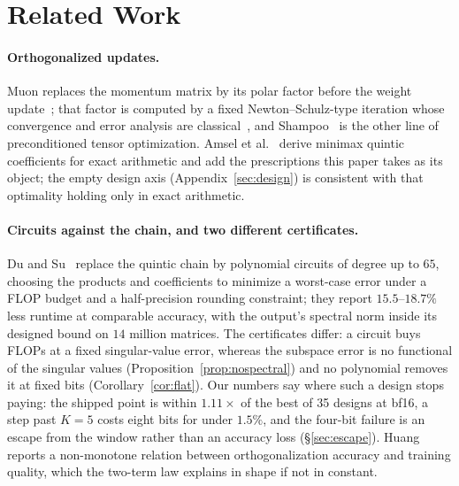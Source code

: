 \section{Related Work}
\label{sec:related}

\paragraph{Orthogonalized updates.}
Muon replaces the momentum matrix by its polar factor before the weight
update~\cite{liu2025muon}; that factor is computed by a fixed Newton--Schulz-type
iteration whose convergence and error analysis are
classical~\cite{higham1986polar,higham2008functions,golub2013matrix}, and
Shampoo~\cite{gupta2018shampoo} is the other line of preconditioned tensor optimization.
Amsel et al.~\cite{amsel2025polar} derive minimax quintic coefficients for exact
arithmetic and add the prescriptions this paper takes as its object; the empty design
axis (Appendix~\ref{sec:design}) is consistent with that optimality holding only in
exact arithmetic.

\paragraph{Circuits against the chain, and two different certificates.}
Du and Su~\cite{du2026polarswitch} replace the quintic chain by polynomial circuits of
degree up to $65$, choosing the products and coefficients to minimize a worst-case error
under a FLOP budget and a half-precision rounding constraint; they report $15.5$--$18.7\%$
less runtime at comparable accuracy, with the output's spectral norm inside its designed
bound on $14$ million matrices.  The certificates differ: a circuit buys FLOPs at a fixed
singular-value error, whereas the subspace error is no functional of the singular values
(Proposition~\ref{prop:nospectral}) and no polynomial removes it at fixed bits
(Corollary~\ref{cor:flat}).  Our numbers say where such a design stops paying: the shipped
point is within $1.11\times$ of the best of 35 designs at bf16, a step past $K=5$ costs
eight bits for under $1.5\%$, and the four-bit failure is an escape from the window rather
than an accuracy loss (\S\ref{sec:escape}).
Huang~\cite{huang2026orthogonalization} reports a non-monotone relation between
orthogonalization accuracy and training quality, which the two-term law explains in shape
if not in constant.

